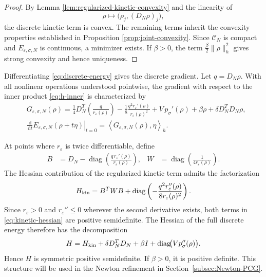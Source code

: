 \documentclass[11pt]{article}
\newcommand{\CN}{\mathcal{C}_N}
\newcommand{\dd}{\,\mathrm{d}}
\newcommand{\eps}{\varepsilon}
\newcommand{\sig}{\sigma}
\newcommand{\inner}[2]{\left\langle #1,#2\right\rangle}
\theoremstyle{plain}
\theoremstyle{definition}
\numberwithin{equation}{section}
\begin{document}
\begin{proof}
By Lemma \ref{lem:regularized-kinetic-convexity} and the linearity of
\[
\rho\mapsto \bigl(\rho_j,(D_N\rho)_j\bigr),
\]
the discrete kinetic term is convex. The remaining terms inherit
the convexity properties established in Proposition \ref{prop:joint-convexity}.
Since $\CN$ is compact and $E_{\eps,\sig,N}$ is continuous, a
minimizer exists. If $\beta>0$, the term
$\frac{\beta}{2}\|\rho\|_h^2$ gives strong convexity and hence
uniqueness.
\end{proof}

Differentiating \eqref{eq:discrete-energy} gives the discrete gradient.
Let $q=D_N\rho$. With all nonlinear operations understood
pointwise, the gradient with respect to the inner product
\eqref{eq:h-inner} is characterized by
\begin{equation}
\label{eq:discrete-gradient}
\begin{aligned}
&G_{\eps,\sig,N}(\rho)
=
\frac14D_N^T
\left(
\frac{q}{r_\eps(\rho)}
\right)
-\frac18
\frac{q^2r_\eps'(\rho)}
     {r_\eps(\rho)^2}
+V\,p_\sig'(\rho)
+\beta\rho
+\delta D_N^TD_N\rho,\\
&\left.
\frac{\dd}{\dd t}
E_{\eps,\sig,N}(\rho+t\eta)
\right|_{t=0}
=
\inner{G_{\eps,\sig,N}(\rho)}{\eta}_h .
\end{aligned}
\end{equation}

At points where $r_\eps$ is twice differentiable, define
\begin{equation}
\label{eq:kinetic-hessian-factorization}
\begin{aligned}
B
&=
D_N-
\operatorname{diag}
\left(
\frac{q\,r_\eps'(\rho)}
     {r_\eps(\rho)}
\right),
&
W
&=
\operatorname{diag}
\left(
\frac{1}{4r_\eps(\rho)}
\right).
\end{aligned}
\end{equation}
The Hessian contribution of the regularized kinetic term admits the
factorization
\begin{equation}
\label{eq:kinetic-hessian}
H_{\rm kin}
=
B^TWB
+
\operatorname{diag}
\left(
-\frac{q^2r_\eps''(\rho)}
       {8r_\eps(\rho)^2}
\right).
\end{equation}
Since $r_\eps>0$ and $r_\eps''\le0$ wherever the second derivative
exists, both terms in \eqref{eq:kinetic-hessian} are positive
semidefinite. The Hessian of the full discrete energy therefore has
the decomposition
\begin{equation}
\label{eq:full-hessian-spd-form}
H
=
H_{\rm kin}
+\delta D_N^TD_N
+\beta I
+\operatorname{diag}\!\bigl(Vp_\sig''(\rho)\bigr).
\end{equation}
Hence $H$ is symmetric positive semidefinite. If $\beta>0$, it is
positive definite. This structure will be used in the Newton refinement in
Section~\ref{subsec:Newton-PCG}.
\end{document}
